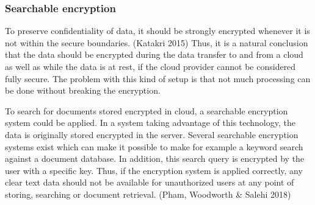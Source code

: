 \documentclass{article}
\begin{document}
\subsubsection{Searchable encryption}
To preserve confidentiality of data, it should be strongly encrypted whenever it is not within the secure boundaries. (Katakri 2015) Thus, it is a natural conclusion that the data should be encrypted during the data transfer to and from a cloud as well as while the data is at rest, if the cloud provider cannot be considered fully secure. The problem with this kind of setup is that not much processing can be done without breaking the encryption.
\par
To search for documents stored encrypted in cloud, a searchable encryption system could be applied. In a system taking advantage of this technology, the data is originally stored encrypted in the server. Several searchable encryption systems exist which can make it possible to make for example a keyword search against a document database. In addition, this search query is encrypted by the user with a specific key. Thus, if the encryption system is applied correctly, any clear text data should not be available for unauthorized users at any point of storing, searching or document retrieval. (Pham, Woodworth \& Salehi 2018) 
\end{document}
